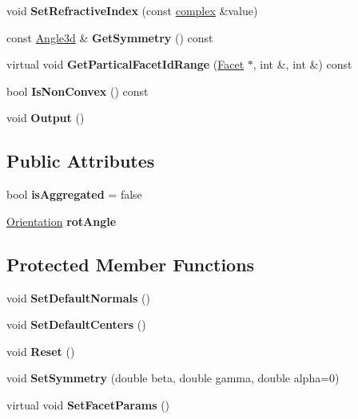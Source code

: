 \begin{DoxyCompactItemize}
void {\bfseries Set\+Refractive\+Index} (const \mbox{\hyperlink{classcomplex}{complex}} \&value)
\item 
\mbox{\label{class_particle_a4b5d31774942742d633aea72c589ffea}} 
const \mbox{\hyperlink{class_angle3d}{Angle3d}} \& {\bfseries Get\+Symmetry} () const
\item 
\mbox{\label{class_particle_a9e5414148dbe4bdcee8a96b9db7d1b6e}} 
virtual void {\bfseries Get\+Partical\+Facet\+Id\+Range} (\mbox{\hyperlink{class_facet}{Facet}} $\ast$, int \&, int \&) const
\item 
\mbox{\label{class_particle_a7bc2c366cbceb9fcae17d4cf8a318a73}} 
bool {\bfseries Is\+Non\+Convex} () const
\item 
\mbox{\label{class_particle_aa93506becba0fc23f34c8da36c2b846b}} 
void {\bfseries Output} ()
\end{DoxyCompactItemize}
\subsection*{Public Attributes}
\begin{DoxyCompactItemize}
\item 
\mbox{\label{class_particle_a57ad5c8ac7c6a4af8546210c5b4b2439}} 
bool {\bfseries is\+Aggregated} = false
\item 
\mbox{\label{class_particle_ad6fcf8ffaf7ee979e7030afb96836ac3}} 
\mbox{\hyperlink{class_angle3d}{Orientation}} {\bfseries rot\+Angle}
\end{DoxyCompactItemize}
\subsection*{Protected Member Functions}
\begin{DoxyCompactItemize}
\item 
\mbox{\label{class_particle_a8df38703bbda2e838467a51a650624dc}} 
void {\bfseries Set\+Default\+Normals} ()
\item 
\mbox{\label{class_particle_ab48482d12c9e0cf4eaa3a23ba9931d44}} 
void {\bfseries Set\+Default\+Centers} ()
\item 
\mbox{\label{class_particle_a77d1dccca2dc8b6c2f28025256f681b8}} 
void {\bfseries Reset} ()
\item 
\mbox{\label{class_particle_af7f8367651719a52accf283d433140bd}} 
void {\bfseries Set\+Symmetry} (double beta, double gamma, double alpha=0)
\item 
\mbox{\label{class_particle_a33bf0c9eb07d48eb3e0c218554f3e20d}} 
virtual void {\bfseries Set\+Facet\+Params} ()
\end{DoxyCompactItemize}
